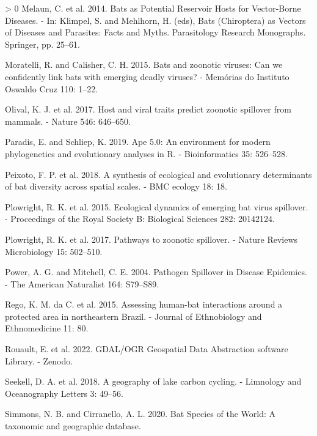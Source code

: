 \documentclass[10pt,oneside]{article}
\newlength{\cslhangindent}
\newenvironment{CSLReferences}[3] %
 {%
  \setlength{\parindent}{0pt}
  \ifodd #1 \everypar{\setlength{\hangindent}{\cslhangindent}}\ignorespaces\fi
  \ifnum #2 > 0
  \setlength{\parskip}{#2\baselineskip}
  \fi
 }%
 {}
\begin{document}
\begin{CSLReferences}{1}{0}
\leavevmode\hypertarget{ref-Melaun2014BatPot}{}%
Melaun, C. et al. 2014. Bats as Potential Reservoir Hosts for
Vector-Borne Diseases. - In: Klimpel, S. and Mehlhorn, H. (eds), Bats
(Chiroptera) as Vectors of Diseases and Parasites: Facts and Myths.
Parasitology Research Monographs. Springer, pp. 25--61.

\leavevmode\hypertarget{ref-Moratelli2015BatZoo}{}%
Moratelli, R. and Calisher, C. H. 2015. Bats and zoonotic viruses: Can
we confidently link bats with emerging deadly viruses? - Memórias do
Instituto Oswaldo Cruz 110: 1--22.

\leavevmode\hypertarget{ref-Olival2017HosVir}{}%
Olival, K. J. et al. 2017. Host and viral traits predict zoonotic
spillover from mammals. - Nature 546: 646--650.

\leavevmode\hypertarget{ref-Paradis2019ApeEnv}{}%
Paradis, E. and Schliep, K. 2019. Ape 5.0: An environment for modern
phylogenetics and evolutionary analyses in R. - Bioinformatics 35:
526--528.

\leavevmode\hypertarget{ref-Peixoto2018SynEco}{}%
Peixoto, F. P. et al. 2018. A synthesis of ecological and evolutionary
determinants of bat diversity across spatial scales. - BMC ecology 18:
18.

\leavevmode\hypertarget{ref-Plowright2015EcoDyn}{}%
Plowright, R. K. et al. 2015. Ecological dynamics of emerging bat virus
spillover. - Proceedings of the Royal Society B: Biological Sciences
282: 20142124.

\leavevmode\hypertarget{ref-Plowright2017PatZoo}{}%
Plowright, R. K. et al. 2017. Pathways to zoonotic spillover. - Nature
Reviews Microbiology 15: 502--510.

\leavevmode\hypertarget{ref-Power2004PatSpi}{}%
Power, A. G. and Mitchell, C. E. 2004. Pathogen Spillover in Disease
Epidemics. - The American Naturalist 164: S79--S89.

\leavevmode\hypertarget{ref-Rego2015AssHum}{}%
Rego, K. M. da C. et al. 2015. Assessing human-bat interactions around a
protected area in northeastern Brazil. - Journal of Ethnobiology and
Ethnomedicine 11: 80.

\leavevmode\hypertarget{ref-RouaultEven2022GdaOgr}{}%
Rouault, E. et al. 2022. GDAL/OGR Geospatial Data Abstraction software
Library. - Zenodo.

\leavevmode\hypertarget{ref-Seekell2018GeoLak}{}%
Seekell, D. A. et al. 2018. A geography of lake carbon cycling. -
Limnology and Oceanography Letters 3: 49--56.

\leavevmode\hypertarget{ref-Simmons2020BatSpe}{}%
Simmons, N. B. and Cirranello, A. L. 2020. Bat Species of the World: A
taxonomic and geographic database.


\end{CSLReferences}
\end{document}
